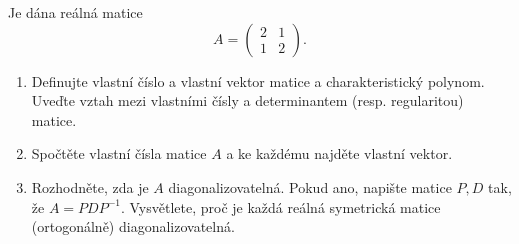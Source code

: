 \begin{zadani}
Je dána reálná matice
\[
A=\begin{pmatrix} 2 & 1\\ 1 & 2 \end{pmatrix}.
\]
\begin{enumerate}[label=(\alph*)]
  \item {} Definujte vlastní číslo a vlastní vektor matice a charakteristický polynom. Uveďte vztah mezi vlastními čísly a determinantem (resp. regularitou) matice.
  \item {} Spočtěte vlastní čísla matice $A$ a ke každému najděte vlastní vektor.
  \item {} Rozhodněte, zda je $A$ diagonalizovatelná. Pokud ano, napište matice $P,D$ tak, že $A=PDP^{-1}$. Vysvětlete, proč je každá reálná symetrická matice (ortogonálně) diagonalizovatelná.
\end{enumerate}
\end{zadani}

